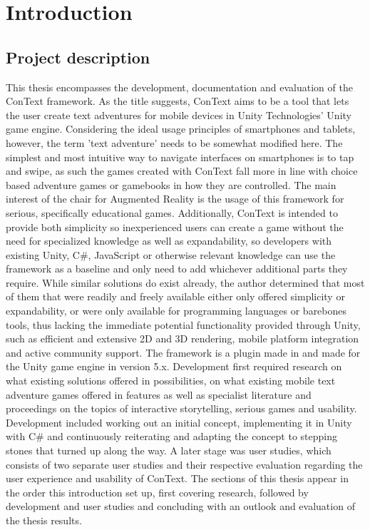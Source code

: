 
\chapter{Introduction}\label{chapter:introduction}

\section{Project description}
This thesis encompasses the development, documentation and evaluation of the ConText framework. As the title suggests, ConText aims to be a tool that lets the user create text adventures for mobile devices in Unity Technologies' Unity game engine\cite{UNITY}. Considering the ideal usage principles of smartphones and tablets, however, the term 'text adventure' needs to be somewhat modified here. The simplest and most intuitive way to navigate interfaces on smartphones is to tap and swipe, as such the games created with ConText fall more in line with choice based adventure games or gamebooks in how they are controlled. The main interest of the chair for Augmented Reality is the usage of this framework for serious, specifically educational games. Additionally, ConText is intended to provide both simplicity so inexperienced users can create a game without the need for specialized knowledge as well as expandability, so developers with existing Unity, C\#, JavaScript or otherwise relevant knowledge can use the framework as a baseline and only need to add whichever additional parts they require. 
While similar solutions do exist already, the author determined that most of them that were readily and freely available either only offered simplicity or expandability, or were only available for programming languages or barebones tools, thus lacking the immediate potential functionality provided through Unity, such as efficient and extensive 2D and 3D rendering, mobile platform integration and active community support. 
The framework is a plugin made in and made for the Unity game engine in version 5.x. Development first required research on what existing solutions offered in possibilities, on what existing mobile text adventure games offered in features as well as specialist literature and proceedings on the topics of interactive storytelling, serious games and usability. Development included working out an initial concept, implementing it in Unity with C\# and continuously reiterating and adapting the concept to stepping stones that turned up along the way. 
A later stage was user studies, which consists of two separate user studies and their respective evaluation regarding the user experience and usability of ConText.
The sections of this thesis appear in the order this introduction set up, first covering research, followed by development and user studies and concluding with an outlook and evaluation of the thesis results.

